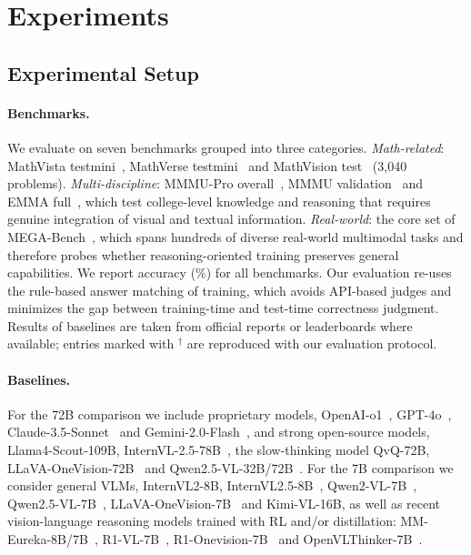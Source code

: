 \documentclass{article}
\begin{document}
\section{Experiments}
\label{sec:experiments}

\subsection{Experimental Setup}

\paragraph{Benchmarks.} We evaluate on seven benchmarks grouped into three categories. \emph{Math-related}: MathVista testmini~\citep{mathvista}, MathVerse testmini~\citep{mathverse} and MathVision test~\citep{mathvision} (3,040 problems). \emph{Multi-discipline}: MMMU-Pro overall~\citep{mmmupro}, MMMU validation~\citep{yue2024mmmu} and EMMA full~\citep{emma}, which test college-level knowledge and reasoning that requires genuine integration of visual and textual information. \emph{Real-world}: the core set of MEGA-Bench~\citep{chen2024mega}, which spans hundreds of diverse real-world multimodal tasks and therefore probes whether reasoning-oriented training preserves general capabilities. We report accuracy (\%) for all benchmarks. Our evaluation re-uses the rule-based answer matching of training, which avoids API-based judges and minimizes the gap between training-time and test-time correctness judgment. Results of baselines are taken from official reports or leaderboards where available; entries marked with $^\dagger$ are reproduced with our evaluation protocol.

\paragraph{Baselines.} For the 72B comparison we include proprietary models, OpenAI-o1~\citep{openai-o1}, GPT-4o~\citep{gpt4o}, Claude-3.5-Sonnet~\citep{claude35} and Gemini-2.0-Flash~\citep{gemini}, and strong open-source models, Llama4-Scout-109B, InternVL-2.5-78B~\citep{internvl_2_5}, the slow-thinking model QvQ-72B, LLaVA-OneVision-72B~\citep{llavaov} and Qwen2.5-VL-32B/72B~\citep{qwen2_5_vl}. For the 7B comparison we consider general VLMs, InternVL2-8B, InternVL2.5-8B~\citep{internvl_2_5}, Qwen2-VL-7B~\citep{qwen2vl}, Qwen2.5-VL-7B~\citep{qwen2_5_vl}, LLaVA-OneVision-7B~\citep{llavaov} and Kimi-VL-16B, as well as recent vision-language reasoning models trained with RL and/or distillation: MM-Eureka-8B/7B~\citep{mmeureka}, R1-VL-7B~\citep{r1vl}, R1-Onevision-7B~\citep{R1OneVision} and OpenVLThinker-7B~\citep{OpenVLThinker}.
\end{document}
